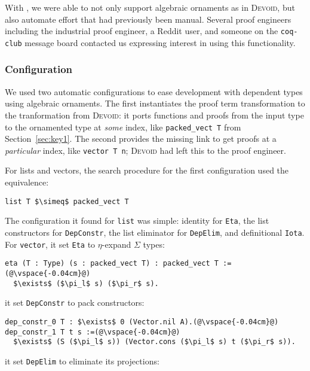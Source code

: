 With \toolname, we were able to not only support algebraic ornaments as in \textsc{Devoid},
but also automate effort that had previously been manual.
Several proof engineers including the industrial proof engineer, a Reddit user,
and someone on the \lstinline{coq-club} message board contacted us expressing interest in using this functionality.

\subsubsection{Configuration}

We used two automatic configurations to ease development with dependent types using algebraic ornaments.
The first instantiates the proof term transformation to the tranformation from \textsc{Devoid}:
it ports functions and proofs from the input type to the ornamented type at \textit{some} index,
like \lstinline{packed_vect T} from Section~\ref{sec:key1}.
The second provides the missing link to get proofs at a \textit{particular} index, like \lstinline{vector T n};
\textsc{Devoid} had left this to the proof engineer.

For lists and vectors, the search procedure for the first configuration used the equivalence:

\begin{lstlisting}
list T $\simeq$ packed_vect T
\end{lstlisting}
The configuration it found for \lstinline{list} was simple: identity for \lstinline{Eta},
the list constructors for \lstinline{DepConstr}, the list eliminator for \lstinline{DepElim},
and definitional \lstinline{Iota}.
For \lstinline{vector}, it set \lstinline{Eta} to $\eta$-expand $\Sigma$ types:

\begin{lstlisting}[backgroundcolor=\color{cyan!30}]
eta (T : Type) (s : packed_vect T) : packed_vect T :=(@\vspace{-0.04cm}@)
  $\exists$ ($\pi_l$ s) ($\pi_r$ s).
\end{lstlisting}
it set \lstinline{DepConstr} to pack constructors: %

\begin{lstlisting}[backgroundcolor=\color{cyan!30}]
dep_constr_0 T : $\exists$ 0 (Vector.nil A).(@\vspace{-0.04cm}@)
dep_constr_1 T t s :=(@\vspace{-0.04cm}@)
  $\exists$ (S ($\pi_l$ s)) (Vector.cons ($\pi_l$ s) t ($\pi_r$ s)).
\end{lstlisting}
it set \lstinline{DepElim} to eliminate its projections:


